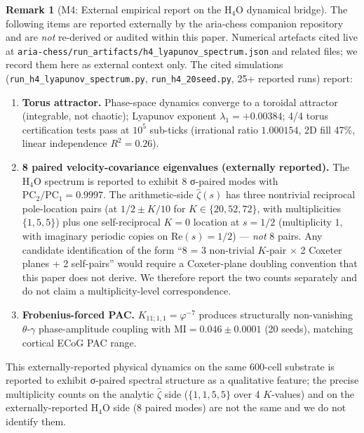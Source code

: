 \documentclass[11pt, a4paper]{amsart}
\theoremstyle{definition}
\newtheorem{remark}[theorem]{Remark}
\begin{document}
\begin{remark}[M4: External empirical report on the H$_4$O dynamical bridge]\label{rmk:h4o_bridge}
The following items are reported externally by the aria-chess
companion repository and are \emph{not} re-derived or audited
within this paper.  Numerical artefacts cited live at
\texttt{aria-chess/run\_artifacts/h4\_lyapunov\_spectrum.json}
and related files; we record them here as external context only.
The cited simulations (\texttt{run\_h4\_lyapunov\_spectrum.py},
\texttt{run\_h4\_20seed.py}, 25+ reported runs) report:
\begin{enumerate}
\item \textbf{Torus attractor.} Phase-space dynamics converge to a
  toroidal attractor (integrable, not chaotic); Lyapunov exponent
  $\lambda_1 = +0.00384$; 4/4 torus certification tests pass at
  $10^5$ sub-ticks (irrational ratio $1.000154$, 2D fill 47\%,
  linear independence $R^2 = 0.26$).
\item \textbf{8 paired velocity-covariance eigenvalues
  (externally reported).} The H$_4$O spectrum is reported to
  exhibit 8 σ-paired modes with $\mathrm{PC}_2/\mathrm{PC}_1
  = 0.9997$.  The arithmetic-side $\widehat\zeta(s)$ has
  three nontrivial reciprocal pole-location pairs (at
  $1/2 \pm K/10$ for $K \in \{20, 52, 72\}$, with multiplicities
  $\{1, 5, 5\}$) plus one self-reciprocal $K=0$ location at
  $s = 1/2$ (multiplicity $1$, with imaginary periodic copies on
  $\mathrm{Re}(s) = 1/2$) — \emph{not} 8 pairs.  Any candidate identification
  of the form ``8 = 3 non-trivial $K$-pair $\times$ 2 Coxeter
  planes + 2 self-pairs'' would require a Coxeter-plane doubling
  convention that this paper does not derive.  We therefore
  report the two counts separately and do not claim a
  multiplicity-level correspondence.
\item \textbf{Frobenius-forced PAC.} $K_{11;1,1} = \varphi^{-7}$
  produces structurally non-vanishing $\theta$-$\gamma$
  phase-amplitude coupling with $\mathrm{MI} = 0.046 \pm 0.0001$
  (20 seeds), matching cortical ECoG PAC range.
\end{enumerate}
This externally-reported physical dynamics on the same 600-cell
substrate is reported to exhibit σ-paired spectral structure as a
qualitative feature; the precise multiplicity counts on the
analytic $\widehat\zeta$ side ($\{1,1,5,5\}$ over 4 $K$-values) and
on the externally-reported H$_4$O side (8 paired modes) are not the
same and we do not identify them.
\end{remark}
\end{document}
